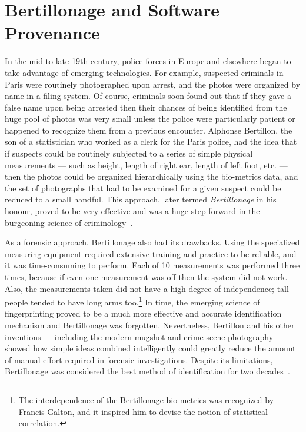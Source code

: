 \section{Bertillonage and Software Provenance{\label{sec:bertillonage}}}

In the mid to late 19th century, police forces in Europe and elsewhere
began to take advantage of emerging technologies.  For example,
suspected criminals in Paris were routinely photographed upon arrest, and
the photos were organized by name in a filing system.  Of course, criminals
soon found out that if they gave a false name upon being arrested then
their chances of being identified from the huge pool of photos was very
small unless the police were particularly patient or happened to recognize
them from a previous encounter.  Alphonse Bertillon, the son of a
statistician who worked as a clerk for the Paris police, had the idea that
if suspects could be routinely subjected to a series of simple physical
measurements --- such as height, length of right ear, length of left foot,
etc. --- then the photos could be organized hierarchically using the
bio-metrics data, and the set of photographs that had to be examined for a
given suspect could be reduced to a small handful.
This approach, later termed \emph{Bertillonage} in his honour, proved to be
very effective and was a huge step forward in the burgeoning science of
criminology~\cite{encyForensic2000}.

As a forensic approach, Bertillonage also had its drawbacks.  Using the
specialized measuring equipment required extensive training and practice to
be reliable, and it was time-consuming to perform.  Each of 10 measurements
was performed three times, because if even one measurement was off then the
system did not work.  Also, the measurements taken did not have a high
degree of independence; tall people tended to have long arms
too.\footnote{The interdependence of the Bertillonage bio-metrics was
recognized by Francis Galton, and it inspired him to devise the notion of
statistical correlation.} In time, the emerging science of fingerprinting
proved to be a much more effective and accurate identification mechanism
and Bertillonage was forgotten.  Nevertheless, Bertillon and his other
inventions --- including the modern mugshot and crime scene photography ---
showed how simple ideas combined intelligently could greatly reduce the
amount of manual effort required in forensic investigations. Despite its
limitations, Bertillonage was considered the best method of identification
for two decades~\cite{forensic2006}.

